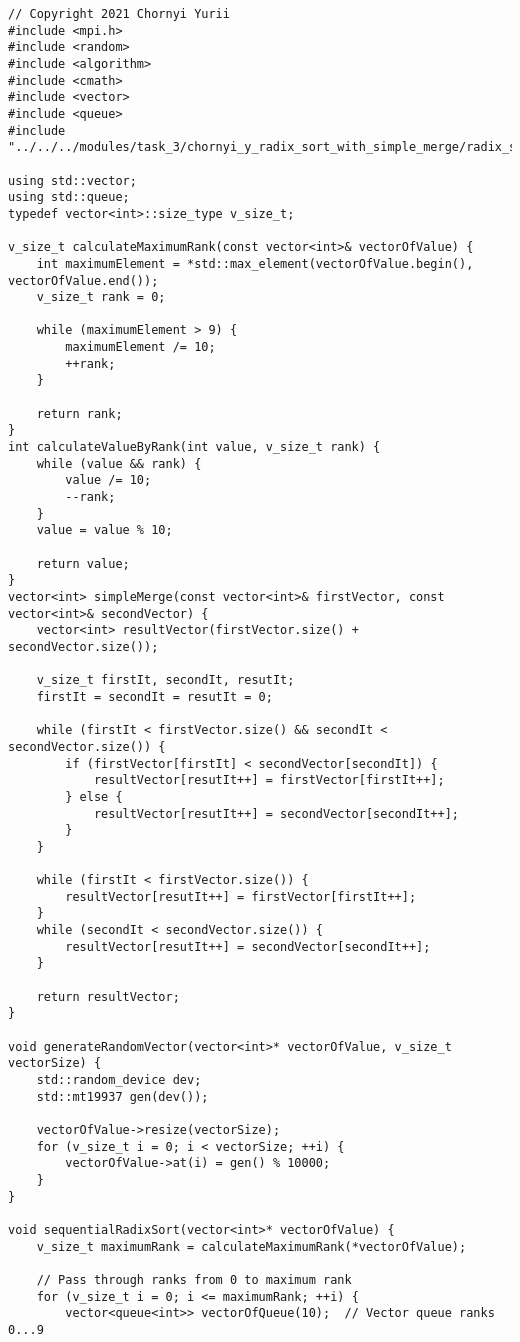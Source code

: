 \documentclass{report}
\begin{document}
\begin{lstlisting}
// Copyright 2021 Chornyi Yurii
#include <mpi.h>
#include <random>
#include <algorithm>
#include <cmath>
#include <vector>
#include <queue>
#include "../../../modules/task_3/chornyi_y_radix_sort_with_simple_merge/radix_sort_with_simple_merge.h"

using std::vector;
using std::queue;
typedef vector<int>::size_type v_size_t;

v_size_t calculateMaximumRank(const vector<int>& vectorOfValue) {
    int maximumElement = *std::max_element(vectorOfValue.begin(), vectorOfValue.end());
    v_size_t rank = 0;

    while (maximumElement > 9) {
        maximumElement /= 10;
        ++rank;
    }

    return rank;
}
int calculateValueByRank(int value, v_size_t rank) {
    while (value && rank) {
        value /= 10;
        --rank;
    }
    value = value % 10;

    return value;
}
vector<int> simpleMerge(const vector<int>& firstVector, const vector<int>& secondVector) {
    vector<int> resultVector(firstVector.size() + secondVector.size());

    v_size_t firstIt, secondIt, resutIt;
    firstIt = secondIt = resutIt = 0;

    while (firstIt < firstVector.size() && secondIt < secondVector.size()) {
        if (firstVector[firstIt] < secondVector[secondIt]) {
            resultVector[resutIt++] = firstVector[firstIt++];
        } else {
            resultVector[resutIt++] = secondVector[secondIt++];
        }
    }

    while (firstIt < firstVector.size()) {
        resultVector[resutIt++] = firstVector[firstIt++];
    }
    while (secondIt < secondVector.size()) {
        resultVector[resutIt++] = secondVector[secondIt++];
    }

    return resultVector;
}

void generateRandomVector(vector<int>* vectorOfValue, v_size_t vectorSize) {
    std::random_device dev;
    std::mt19937 gen(dev());

    vectorOfValue->resize(vectorSize);
    for (v_size_t i = 0; i < vectorSize; ++i) {
        vectorOfValue->at(i) = gen() % 10000;
    }
}

void sequentialRadixSort(vector<int>* vectorOfValue) {
    v_size_t maximumRank = calculateMaximumRank(*vectorOfValue);

    // Pass through ranks from 0 to maximum rank
    for (v_size_t i = 0; i <= maximumRank; ++i) {
        vector<queue<int>> vectorOfQueue(10);  // Vector queue ranks 0...9


\end{lstlisting}
\end{document}
